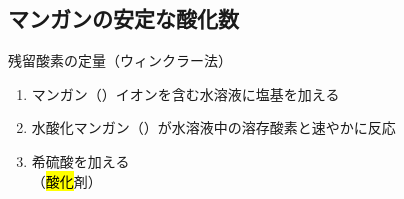 \subsection{マンガンの安定な酸化数}
残留酸素の定量（ウィンクラー法）
\begin{enumerate}
  \item マンガン（）イオンを含む水溶液に塩基を加える\\
  \item 水酸化マンガン（）が水溶液中の溶存酸素と速やかに反応\\
  \item 希硫酸を加える\\
        （\hl{酸化}剤）
\end{enumerate}